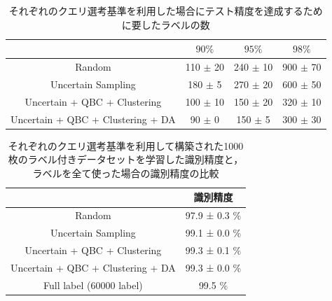\begin{table}[h]
    \caption{\label{table:mnist_samplenum_accuracy}それぞれのクエリ選考基準を利用した場合にテスト精度を達成するために要したラベルの数}
    \center
    \begin{tabular}{c|c|c|c} 
         & $90\%$ & $95\%$ & $98\%$ \\ \hline
        Random & 110 $\pm$ 20 & 240 $\pm$ 10 & 900 $\pm$ 70 \\
        Uncertain Sampling & 180 $\pm$ 5 & 270 $\pm$ 20  & 600 $\pm$ 50 \\
        Uncertain + QBC + Clustering & 100 $\pm$ 10 & 150 $\pm$ 20 & 320 $\pm$ 10 \\ 
        Uncertain + QBC + Clustering + DA & 90 $\pm$ 0 & 150 $\pm$ 5 & 300 $\pm$ 30 \\

    \end{tabular}
\end{table}

\begin{table}[h]
    \caption{\label{table:mnist_last_accuracy}それぞれのクエリ選考基準を利用して構築された1000枚のラベル付きデータセットを学習した識別精度と，ラベルを全て使った場合の識別精度の比較}
    \center
    \begin{tabular}{c|c} 
         &  識別精度 \\ \hline
        Random & 97.9 ± 0.3  $\%$ \\
        Uncertain Sampling & 99.1 ± 0.0 $\%$  \\
        Uncertain + QBC + Clustering & 99.3 ± 0.1  $\%$ \\ 
        Uncertain + QBC + Clustering + DA & 99.3 ± 0.0  $\%$ \\ \hline
        Full label (60000 label) & 99.5 $\%$
    \end{tabular}
\end{table}

